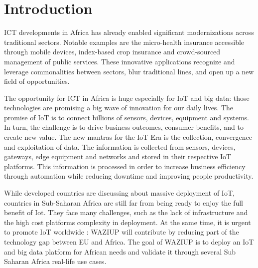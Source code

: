 
\section{Introduction}


\noindent
{}

ICT developments in Africa has already enabled significant modernizations across traditional sectors.
Notable examples are the micro-health insurance accessible through mobile devices, index-based crop insurance and crowd-sourced management of public services.
These innovative applications recognize and leverage commonalities between sectors, blur traditional lines, and open up a new field of opportunities.

The opportunity for ICT in Africa is huge especially for IoT and big data: those technologies are promising a big wave of innovation for our daily lives.
The promise of IoT is to connect billions of sensors, devices, equipment and systems.
In turn, the challenge is to drive business outcomes, consumer benefits, and to create new value.
The new mantras for the IoT Era is the collection, convergence and exploitation of data.
The information is collected from sensors, devices, gateways, edge equipment and networks and stored in their respective IoT platforms.
This information is processed in order to increase business efficiency through automation while reducing downtime and improving people productivity.

While developed countries are discussing about massive deployment of IoT, countries in Sub-Saharan Africa are still far from being ready to enjoy the full benefit of Iot.
They face many challenges, such as the lack of infrastructure and the high cost platforms complexity in deployment.
At the same time, it is urgent to promote IoT worldwide : WAZIUP will contribute by reducing part of the technology gap between EU and Africa.
The goal of WAZIUP is to deploy an IoT and big data platform for African needs and validate it through several Sub Saharan Africa real-life use cases.

